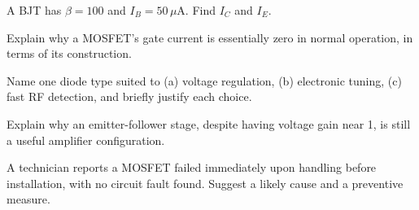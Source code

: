 \begin{practiceproblems}
\item A BJT has $\beta = 100$ and $I_B = 50\,\mu\text{A}$. Find $I_C$ and
$I_E$.
\item Explain why a MOSFET's gate current is essentially zero in normal
operation, in terms of its construction.
\item Name one diode type suited to (a) voltage regulation, (b)
electronic tuning, (c) fast RF detection, and briefly justify each
choice.
\item Explain why an emitter-follower stage, despite having voltage gain
near 1, is still a useful amplifier configuration.
\item A technician reports a MOSFET failed immediately upon handling
before installation, with no circuit fault found. Suggest a likely
cause and a preventive measure.
\end{practiceproblems}
